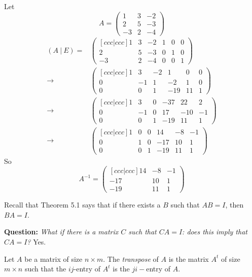 \documentclass[10pt]{scrartcl}
\begin{document}
\begin{example}
Let 
\[
  A = \begin{pmatrix}
 1 & 3 & -2\\ 2& 5 & -3\\ -3 & 2 & -4	
 \end{pmatrix}
\]
\begin{align*}
  (A ~|~ E) = &\begin{pmatrix}[ccc|ccc]
1 & 3 & -2 & 1 & 0 & 0\\
2 & 5 & -3 & 0 & 1 & 0\\
-3 & 2 & -4 & 0 & 0 & 1
\end{pmatrix}\\[0.2cm]
\longrightarrow 
&\begin{pmatrix}[ccc|ccc]
1 & 3 & -2 & 1 & 0 & 0\\
0 & -1 & 1 & -2 & 1 & 0\\
0 & 0 & 1 & -19 & 11 & 1
\end{pmatrix}\\[0.2cm]
\longrightarrow 
&\begin{pmatrix}[ccc|ccc]
1 & 3 & 0 & -37 & 22 & 2\\
0 & -1 & 0 & 17 & -10 & -1\\
0 & 0 & 1 & -19 & 11 & 1
\end{pmatrix}\\[0.2cm]
\longrightarrow
&\begin{pmatrix}[ccc|ccc]
1 & 0 & 0 & 14 & -8 & -1\\
0 & 1 & 0 & -17 & 10 & 1\\
0 & 0 & 1 & -19 & 11 & 1
\end{pmatrix}
\end{align*}
So 
\[A^{-1} = \begin{pmatrix}[ccc|ccc]
 14 & -8 & -1\\
 -17 & 10 & 1\\
 -19 & 11 & 1	
 \end{pmatrix}
\]
\end{example}

Recall that Theorem 5.1 says that if there exists a $B$ such that $AB = I$, then $BA = I$. 

\textbf{Question:} \emph{What if there is a matrix $C$ such that $CA = I$: does this imply that $CA = I$?} Yes. 

\vsp

\begin{definition}
Let $A$ be a matrix of size $n \times m$. The \emph{transpose} of $A$ is the matrix $A^t$ of size $m \times n$ such that the $ij$-entry of $A^t$ is the $ji-$entry of $A$.	
\end{definition}
\end{document}
